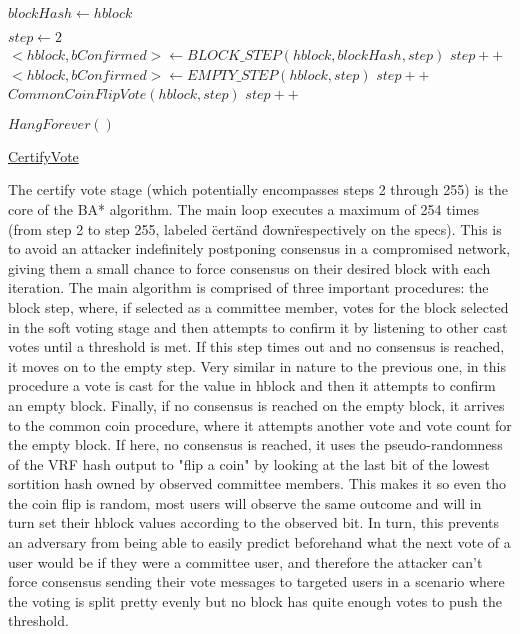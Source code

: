 \documentclass[10pt,a4paper]{article}
\begin{document}
\begin{algorithm}
    \begin{algorithmic}[H]
    \State $blockHash \gets hblock$

    \State $step \gets 2$
        \\
        \State $<hblock, bConfirmed> \gets BLOCK\_STEP(hblock, blockHash, step)$
        \EndIf
        \State $step++$\\
   
        \State $<hblock, bConfirmed> \gets EMPTY\_STEP(hblock,step)$
        \EndIf
        \State $step++$\\

        \State $CommonCoinFlipVote(hblock, step)$
        \State $step++$
    \EndWhile

\State $HangForever()$
    
    \EndFunction
    \end{algorithmic}
    \caption{\underline{CertifyVote}}
\end{algorithm}

The certify vote stage (which potentially encompasses steps 2 through 255) is the core of the BA* algorithm.
The main loop executes a maximum of 254 times (from step 2 to step 255, labeled \"cert\" and \"down\" respectively on the specs).
This is to avoid an attacker indefinitely postponing consensus in a compromised network, giving them a small chance to force consensus on their desired block with each iteration.
The main algorithm is comprised of three important procedures: the block step, where, if selected as a committee member, votes for the block selected in the soft voting stage and then attempts to confirm it by listening to other cast votes until a threshold is met.
If this step times out and no consensus is reached, it moves on to the empty step. Very similar in nature to the previous one, in this procedure a vote is cast for the value in hblock and then it attempts to confirm an empty block.
Finally, if no consensus is reached on the empty block, it arrives to the common coin procedure, where it attempts another vote and vote count for the empty block. If here, no consensus is reached, it uses the pseudo-randomness of the VRF hash output to "flip a coin" by looking at the last bit of the lowest sortition hash owned by observed committee members.
This makes it so even tho the coin flip is random, most users will observe the same outcome and will in turn set their hblock values according to the observed bit. In turn, this prevents an adversary from being able to easily predict beforehand what the next vote of a user would be if they were a committee user, and therefore the attacker can't force consensus 
sending their vote messages to targeted users in a scenario where the voting is split pretty evenly but no block has quite enough votes to push the threshold.\\
\\
\\
\end{document}
